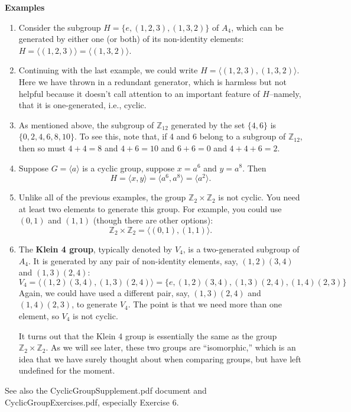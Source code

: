 \documentclass[12pt]{article}
\newcommand{\Z} {{\mathbb Z}}
\newcommand{\<}{\ensuremath{\langle}}
\renewcommand{\>}{\ensuremath{\rangle}}
\theoremstyle{plain}
\theoremstyle{definition}
\begin{document}
{\bf Examples}
\begin{enumerate}
\item 
Consider the subgroup $H = \{e, (1,2,3), (1,3,2)\}$ of $A_4$,
which can be generated by either one (or both)
of its non-identity elements:
$H = \<(1,2,3)\> = \<(1,3,2)\>$.

\item
Continuing with the last example, we could write $H = \<(1,2,3), (1,3,2)\>$.
Here we have thrown in a redundant generator, which is harmless but not helpful
because it doesn't call attention to an important feature of $H$--namely, that it is
one-generated, i.e., cyclic.

\item As mentioned above, the subgroup of $\Z_{12}$ generated by the set $\{4, 6\}$ is 
$\{0, 2, 4, 6, 8, 10\}$.
To see this, note that, if 4 and 6 belong to a
subgroup of $\Z_{12}$, then so must $4+4=8$ and $4+6=10$ and $6+6=0$ and
$4+4+6=2$.

\item 
Suppose $G = \<a\>$ is a cyclic group, suppose $x = a^6$ and $y = a^8$.
Then 
\[
H = \<x, y\> = \<a^6, a^8\> = \<a^2\>.
\]

\item
Unlike all of the previous examples, the group $\Z_2 \times \Z_2$ is not cyclic.
You need at least two elements to generate this group.  For example, you could
use $(0,1)$ and $(1,1)$ (though there are other options):
\[
\Z_2 \times \Z_2 = \<(0,1), (1,1)\>.
\]

\item
The {\bf Klein 4 group}, typically denoted by $V_4$, is a two-generated subgroup of $A_4$.
It is generated by any pair of non-identity elements, say, $(1,2)(3,4)$ and $(1,3)(2,4)$:
\[
V_4 = \<(1,2)(3,4), (1,3)(2,4)\> = \{e, (1,2)(3,4), (1,3)(2,4), (1,4)(2,3)\}
\]
Again, we could have used a different pair, say, $(1,3)(2,4)$ and $(1,4)(2,3)$,
to generate $V_4$. The point is that we need more than one element, so $V_4$
is not cyclic. 

It turns out that the Klein 4 group is essentially the same
 as the group $\Z_2 \times \Z_2$. As we will see later, these two groups are
 ``isomorphic,'' which is an idea that we have surely thought about when
 comparing groups, but have left undefined for the moment.

\end{enumerate}
See also the CyclicGroupSupplement.pdf document and CyclicGroupExercises.pdf,
especially Exercise 6.
\end{document}
